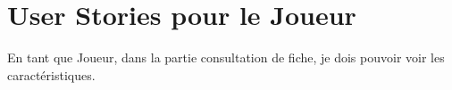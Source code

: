 \chapter{User Stories pour le Joueur}

En tant que Joueur, dans la partie consultation de fiche, je dois pouvoir voir
les caractéristiques.

\clearpage
